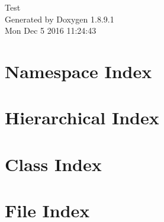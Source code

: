 \documentclass[twoside]{book}
\newcommand{\+}{\discretionary{\mbox{\scriptsize$\hookleftarrow$}}{}{}}
\newcommand{\clearemptydoublepage}{%
  \newpage{\pagestyle{empty}\cleardoublepage}%
}
\begin{document}
\hypersetup{pageanchor=false,
             bookmarks=true,
             bookmarksnumbered=true,
             pdfencoding=unicode
            }
\begin{titlepage}
\vspace*{7cm}
\begin{center}%
{\Large Test }\\
\vspace*{1cm}
{\large Generated by Doxygen 1.8.9.1}\\
\vspace*{0.5cm}
{\small Mon Dec 5 2016 11:24:43}\\
\end{center}
\end{titlepage}
\clearemptydoublepage
\tableofcontents
\clearemptydoublepage
{}
\hypersetup{pageanchor=true}

\chapter{Namespace Index}

\chapter{Hierarchical Index}

\chapter{Class Index}

\chapter{File Index}

\end{document}
